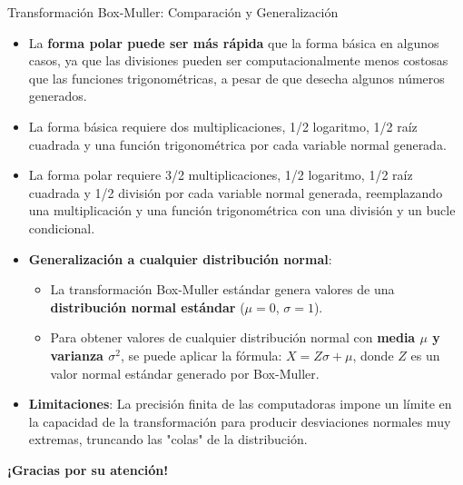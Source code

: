 \documentclass{beamer}
\begin{document}
\begin{frame}{Transformación Box-Muller: Comparación y Generalización}
    \begin{itemize}
        \item La \textbf{forma polar puede ser más rápida} que la forma básica en algunos casos, ya que las divisiones pueden ser computacionalmente menos costosas que las funciones trigonométricas, a pesar de que desecha algunos números generados.
        \item La forma básica requiere dos multiplicaciones, 1/2 logaritmo, 1/2 raíz cuadrada y una función trigonométrica por cada variable normal generada.
        \item La forma polar requiere 3/2 multiplicaciones, 1/2 logaritmo, 1/2 raíz cuadrada y 1/2 división por cada variable normal generada, reemplazando una multiplicación y una función trigonométrica con una división y un bucle condicional.
        \item \textbf{Generalización a cualquier distribución normal}:
            \begin{itemize}
                \item La transformación Box-Muller estándar genera valores de una \textbf{distribución normal estándar} ($\mu=0$, $\sigma=1$).
                \item Para obtener valores de cualquier distribución normal con \textbf{media $\mu$ y varianza $\sigma^2$}, se puede aplicar la fórmula: $X = Z\sigma + \mu$, donde $Z$ es un valor normal estándar generado por Box-Muller.
            \end{itemize}
        \item \textbf{Limitaciones}: La precisión finita de las computadoras impone un límite en la capacidad de la transformación para producir desviaciones normales muy extremas, truncando las "colas" de la distribución.
    \end{itemize}
\end{frame}

\begin{frame}
    \centering
    \textbf{¡Gracias por su atención!}
\end{frame}
\end{document}
